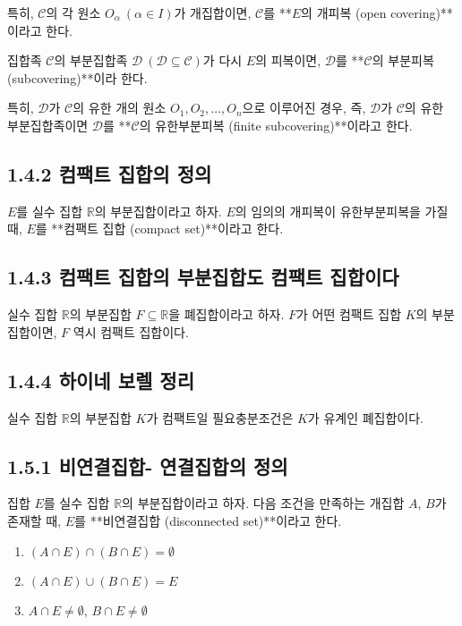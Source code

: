 \documentclass{article}
\begin{document}
특히, $\mathscr{C}$의 각 원소 $O_\alpha \ (\alpha \in I)$가 개집합이면, $\mathscr{C}$를 **$E$의 개피복 (open covering)**이라고 한다.

집합족 $\mathscr{C}$의 부분집합족 $\mathscr{D} \ (\mathscr{D} \subseteq \mathscr{C})$가 다시 $E$의 피복이면, $\mathscr{D}$를 **$\mathscr{C}$의 부분피복 (subcovering)**이라 한다.

특히, $\mathscr{D}$가 $\mathscr{C}$의 유한 개의 원소 $O_1, O_2, \dots, O_n$으로 이루어진 경우,  
즉, $\mathscr{D}$가 $\mathscr{C}$의 유한 부분집합족이면 $\mathscr{D}$를 **$\mathscr{C}$의 유한부분피복 (finite subcovering)**이라고 한다.



\subsection*{\textmd{1.4.2 컴팩트 집합의 정의}}
$E$를 실수 집합 $\mathbb{R}$의 부분집합이라고 하자.  
$E$의 임의의 개피복이 유한부분피복을 가질 때, $E$를 **컴팩트 집합 (compact set)**이라고 한다.



\subsection*{\textmd{1.4.3 컴팩트 집합의 부분집합도 컴팩트 집합이다}}
실수 집합 $\mathbb{R}$의 부분집합 $F \subseteq \mathbb{R}$을 폐집합이라고 하자.  
$F$가 어떤 컴팩트 집합 $K$의 부분집합이면, $F$ 역시 컴팩트 집합이다.




\subsection*{\textmd{1.4.4 하이네 보렐 정리}}
실수 집합 $\mathbb{R}$의 부분집합 $K$가 컴팩트일 필요충분조건은  
$K$가 유계인 폐집합이다.



\subsection*{\textmd{1.5.1 비연결집합- 연결집합의 정의}}
집합 $E$를 실수 집합 $\mathbb{R}$의 부분집합이라고 하자.  
다음 조건을 만족하는 개집합 $A$, $B$가 존재할 때, $E$를 **비연결집합 (disconnected set)**이라고 한다.

\begin{enumerate}
    \item $(A \cap E) \cap (B \cap E) = \emptyset$
    \item $(A \cap E) \cup (B \cap E) = E$
    \item $A \cap E \neq \emptyset$, $B \cap E \neq \emptyset$
\end{enumerate}
\end{document}
